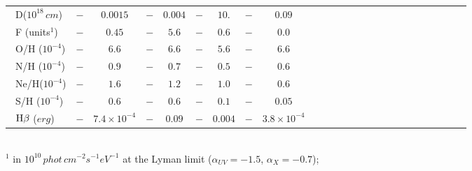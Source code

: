 \documentclass[../thesis.tex]{subfiles}
\begin{document}
\begin{landscape}
\begin{table}
\begin{tabular}{lcccccccccccccccccccccccc}
\ D($10^{18}\,\si{cm}$)      &$-      $&$0.0015$&$-    $&$0.004 $&$-     $&$10.   $&$-     $&$0.09  $\\
\ F (units$^1$)       &$-      $&$ 0.45 $&$-    $&$5.6   $&$-     $&$0.6   $&$-    $&$0.0     $\\
\ O/H ($10^{-4}$)     &$-      $&$ 6.6  $&$-    $&$6.6   $&$-     $&$5.6   $&$-     $&$6.6     $\\
\ N/H ($10^{-4}$)     &$-      $&$ 0.9  $&$-    $&$0.7   $&$-     $&$0.5   $&$-     $&$0.6     $\\
\ Ne/H($10^{-4}$)     &$-      $&$ 1.6  $&$-    $&$1.2   $&$-     $&$1.0   $&$-     $&$0.6    $\\
\ S/H ($10^{-4}$)     &$-      $&$ 0.6  $&$-    $&$0.6   $&$-     $&$0.1   $&$-     $&$0.05    $\\
\ $\rm H\beta$ ($\si{erg}$)          &$-      $&$7.4\times10^{-4}$&$-    $&$0.09  $&$-     $&$0.004 $&$-     $&$3.8\times10^{-4} $ \\ \hline

\end{tabular}\\
$^1$ in $10^{10}\,\si{phot\,cm^{-2} s^{-1} eV^{-1}}$ at the Lyman limit
(${\alpha}_{UV}=-1.5$, ${\alpha}_X=-0.7$);

\end{table}\end{landscape}
\end{document}

